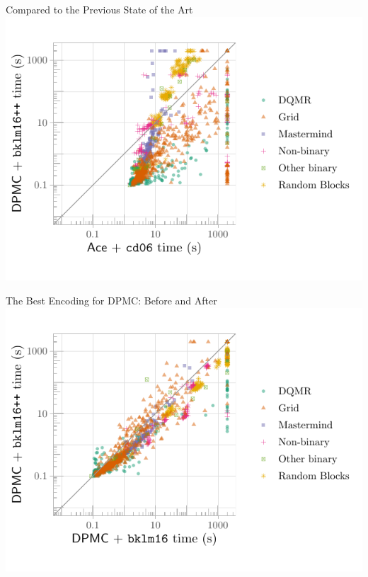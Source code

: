 \documentclass{beamer}
\begin{document}
\begin{frame}{Compared to the Previous State of the Art}
  \centering
  \includegraphics[width=\textwidth]{scatter1}
\end{frame}

\begin{frame}{The Best Encoding for DPMC: Before and After}
  \centering
  \includegraphics[width=\textwidth]{scatter2}
\end{frame}

\end{document}
